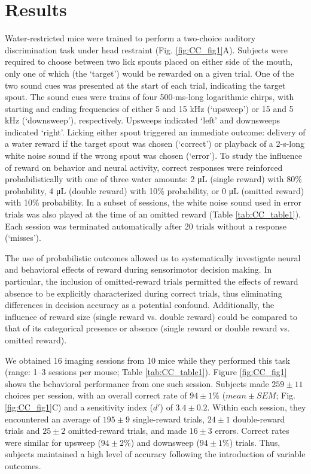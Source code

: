 \section{Results}

Water-restricted mice were trained to perform a two-choice auditory discrimination task under head restraint (Fig. \ref{fig:CC_fig1}A). Subjects were required to choose between two lick spouts placed on either side of the mouth, only one of which (the ‘target’) would be rewarded on a given trial. One of the two sound cues was presented at the start of each trial, indicating the target spout. The sound cues were trains of four 500-ms-long logarithmic chirps, with starting and ending frequencies of either 5 and 15 kHz (‘upsweep’) or 15 and 5 kHz (‘downsweep’), respectively. Upsweeps indicated ‘left’ and downsweeps indicated ‘right’. Licking either spout triggered an immediate outcome: delivery of a water reward if the target spout was chosen (‘correct’) or playback of a 2-s-long white noise sound if the wrong spout was chosen (‘error’). To study the influence of reward on behavior and neural activity, correct responses were reinforced probabilistically with one of three water amounts: 2 \si{\uL} (single reward) with 80\% probability, 4 \si{\uL} (double reward) with 10\% probability, or 0 \si{\uL} (omitted reward) with 10\% probability. In a subset of sessions, the white noise sound used in error trials was also played at the time of an omitted reward (Table \ref{tab:CC_table1}). Each session was terminated automatically after 20 trials without a response (‘misses’).



The use of probabilistic outcomes allowed us to systematically investigate neural and behavioral effects of reward during sensorimotor decision making. In particular, the inclusion of omitted-reward trials permitted the effects of reward absence to be explicitly characterized during correct trials, thus eliminating differences in decision accuracy as a potential confound. Additionally, the influence of reward size (single reward vs. double reward) could be compared to that of its categorical presence or absence (single reward or double reward vs. omitted reward).

We obtained 16 imaging sessions from 10 mice while they performed this task (range: 1--3 sessions per mouse; Table \ref{tab:CC_table1}). Figure \ref{fig:CC_fig1} shows the behavioral performance from one such session. Subjects made $259 \pm 11$ choices per session, with an overall correct rate of $94 \pm 1\%$ ($mean \pm SEM$; Fig. \ref{fig:CC_fig1}C) and a sensitivity index ($d'$) of $3.4 \pm 0.2$. Within each session, they encountered an average of $195 \pm 9$ single-reward trials, $24 \pm 1$ double-reward trials and $25 \pm 2$ omitted-reward trials, and made $16 \pm 3$ errors. Correct rates were similar for upsweep ($94 \pm 2\%$) and downsweep ($94 \pm 1\%$) trials. Thus, subjects maintained a high level of accuracy following the introduction of variable outcomes.

